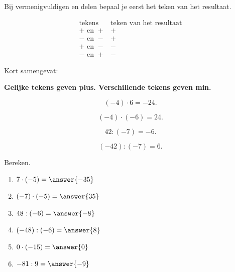\documentclass{ximera}
\begin{document}

Bij vermenigvuldigen en delen bepaal je eerst het teken van het resultaat.

\[
\begin{array}{c|c}
\text{tekens} & \text{teken van het resultaat} \\ \hline
+\text{ en }+ & + \\
-\text{ en }- & + \\
+\text{ en }- & - \\
-\text{ en }+ & -
\end{array}
\]

Kort samengevat:

\begin{center}
\textbf{Gelijke tekens geven plus. Verschillende tekens geven min.}
\end{center}

\begin{example}
\[
(-4)\cdot 6=-24.
\]
\end{example}

\begin{example}
\[
(-4)\cdot(-6)=24.
\]
\end{example}

\begin{example}
\[
42:(-7)=-6.
\]
\end{example}

\begin{example}
\[
(-42):(-7)=6.
\]
\end{example}

\begin{exercise}
Bereken.

\begin{enumerate}
    \item $7\cdot(-5)=\answer{-35}$
    \item $(-7)\cdot(-5)=\answer{35}$
    \item $48:(-6)=\answer{-8}$
    \item $(-48):(-6)=\answer{8}$
    \item $0\cdot(-15)=\answer{0}$
    \item $-81:9=\answer{-9}$
\end{enumerate}
\end{exercise}

\end{document}
